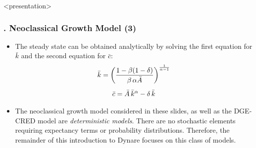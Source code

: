 \documentclass[11pt,aspectratio=169]{beamer}
\begin{document}
\begin{frame}<presentation>
	\frametitle{{\thesection.\thesubsection \thinspace\thesubsubsection} Neoclassical Growth Model (3)}
	\begin{itemize}
		\item The steady state can be obtained analytically by solving the first equation for $\bar{k}$ and the second equation for $\bar{c}$:
		\begin{gather*}
		\bar{k} = \bigg(\frac{1-\beta (1-\delta)}{\beta\thinspace\alpha\bar{A}}\bigg)^\frac{1}{\alpha -1}\\[5pt]
		\bar{c} = \bar{A} \thinspace \bar{k}^\alpha - \delta \thinspace \bar{k}		
		\end{gather*}
		\item The neoclassical growth model considered in these slides, as well as the \linebreak DGE-CRED model are \textit{deterministic models}. There are no stochastic elements requiring expectancy terms or probability distributions. Therefore, the remainder of this introduction to Dynare focuses on this class of models.
	\end{itemize}
\end{frame}
\end{document}
